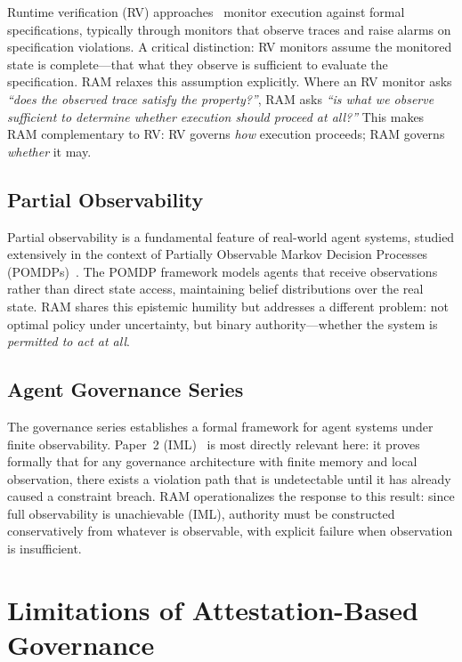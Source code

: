 \documentclass[11pt]{article}
\begin{document}
Runtime verification (RV) approaches~\cite{leucker2009brief, falcone2012runtime,
havelund2001java} monitor execution against formal specifications, typically
through monitors that observe traces and raise alarms on specification violations.
A critical distinction: RV monitors assume the monitored state is complete---that
what they observe is sufficient to evaluate the specification.
RAM relaxes this assumption explicitly.
Where an RV monitor asks \emph{``does the observed trace satisfy the property?''},
RAM asks \emph{``is what we observe sufficient to determine whether execution
should proceed at all?''}
This makes RAM complementary to RV: RV governs \emph{how} execution proceeds;
RAM governs \emph{whether} it may.

\subsection{Partial Observability}

Partial observability is a fundamental feature of real-world agent systems,
studied extensively in the context of Partially Observable Markov Decision
Processes (POMDPs)~\cite{kaelbling1998planning}.
The POMDP framework models agents that receive observations rather than direct
state access, maintaining belief distributions over the real state.
RAM shares this epistemic humility but addresses a different problem: not
optimal policy under uncertainty, but binary authority---whether the system is
\emph{permitted to act at all}.

\subsection{Agent Governance Series}

The governance series establishes a formal framework for agent systems under
finite observability.
Paper~2 (IML)~\cite{fernandez2026c} is most directly relevant here:
it proves formally that for any governance architecture with finite memory and
local observation, there exists a violation path that is undetectable until it
has already caused a constraint breach.
RAM operationalizes the response to this result: since full observability is
unachievable (IML), authority must be constructed conservatively from whatever
is observable, with explicit failure when observation is insufficient.

\section{Limitations of Attestation-Based Governance}
\label{sec:limits}
\end{document}
